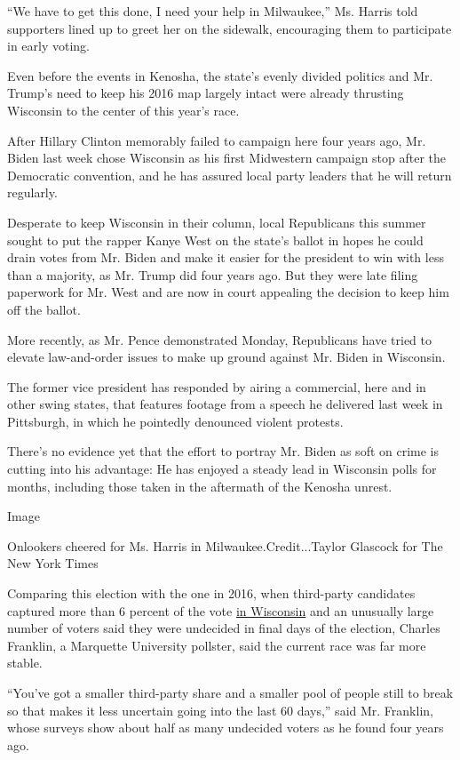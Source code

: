 ``We have to get this done, I need your help in Milwaukee,'' Ms. Harris
told supporters lined up to greet her on the sidewalk, encouraging them
to participate in early voting.

Even before the events in Kenosha, the state's evenly divided politics
and Mr. Trump's need to keep his 2016 map largely intact were already
thrusting Wisconsin to the center of this year's race.

After Hillary Clinton memorably failed to campaign here four years ago,
Mr. Biden last week chose Wisconsin as his first Midwestern campaign
stop after the Democratic convention, and he has assured local party
leaders that he will return regularly.

Desperate to keep Wisconsin in their column, local Republicans this
summer sought to put the rapper Kanye West on the state's ballot in
hopes he could drain votes from Mr. Biden and make it easier for the
president to win with less than a majority, as Mr. Trump did four years
ago. But they were late filing paperwork for Mr. West and are now in
court appealing the decision to keep him off the ballot.

More recently, as Mr. Pence demonstrated Monday, Republicans have tried
to elevate law-and-order issues to make up ground against Mr. Biden in
Wisconsin.

The former vice president has responded by airing a commercial, here and
in other swing states, that features footage from a speech he delivered
last week in Pittsburgh, in which he pointedly denounced violent
protests.

There's no evidence yet that the effort to portray Mr. Biden as soft on
crime is cutting into his advantage: He has enjoyed a steady lead in
Wisconsin polls for months, including those taken in the aftermath of
the Kenosha unrest.

Image

Onlookers cheered for Ms. Harris in Milwaukee.Credit...Taylor Glascock
for The New York Times

Comparing this election with the one in 2016, when third-party
candidates captured more than 6 percent of the vote
\href{https://www.nytimes3xbfgragh.onion/elections/2016/results/wisconsin}{in
Wisconsin} and an unusually large number of voters said they were
undecided in final days of the election, Charles Franklin, a Marquette
University pollster, said the current race was far more stable.

``You've got a smaller third-party share and a smaller pool of people
still to break so that makes it less uncertain going into the last 60
days,'' said Mr. Franklin, whose surveys show about half as many
undecided voters as he found four years ago.

